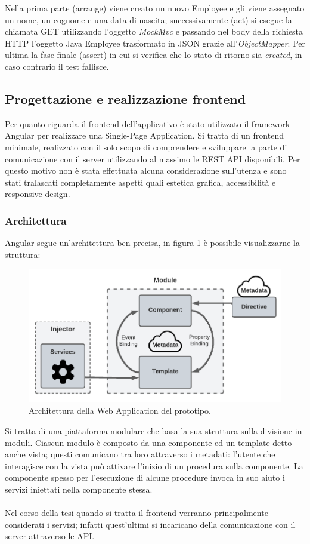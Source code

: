 Nella prima parte (arrange) viene creato un nuovo Employee e gli viene assegnato un nome, un cognome e una data di nascita; successivamente (act) si esegue la chiamata GET utilizzando l'oggetto \textit{MockMvc} e passando nel body della richiesta HTTP l'oggetto Java Employee trasformato in JSON grazie all'\textit{ObjectMapper}. Per ultima la fase finale (assert) in cui si verifica che lo stato di ritorno sia \textit{created}, in caso contrario il test fallisce.
\subsection{Progettazione e realizzazione frontend}
Per quanto riguarda il frontend dell'applicativo è stato utilizzato il framework Angular per realizzare una Single-Page Application. Si tratta di un frontend minimale, realizzato con il solo scopo di comprendere e sviluppare la parte di comunicazione con il server utilizzando al massimo le REST API disponibili. Per questo motivo non è stata effettuata alcuna considerazione sull'utenza e sono stati tralascati completamente aspetti quali estetica grafica, accessibilità e responsive design.\\
\subsubsection*{Architettura}
Angular segue un'architettura ben precisa, in figura \ref{angular-architecture} è possibile visualizzarne la struttura:
\FloatBarrier
\begin{figure}[!ht]
\centering
\includegraphics[width=1\linewidth]{immagini/angularArchitecture.pdf}
\caption{Architettura della Web Application del prototipo.}
\label{angular-architecture}
\end{figure}
\FloatBarrier
Si tratta di una piattaforma modulare che basa la sua struttura sulla divisione in moduli. Ciascun modulo è composto da una componente ed un template detto anche vista; questi comunicano tra loro attraverso i metadati: l'utente che interagisce con la vista può attivare l'inizio di un procedura sulla componente. La componente spesso per l'esecuzione di alcune procedure invoca in suo aiuto i servizi iniettati nella componente stessa. \\\\
Nel corso della tesi quando si tratta il frontend verranno principalmente considerati i servizi; infatti quest'ultimi si incaricano della comunicazione con il server attraverso le API.
